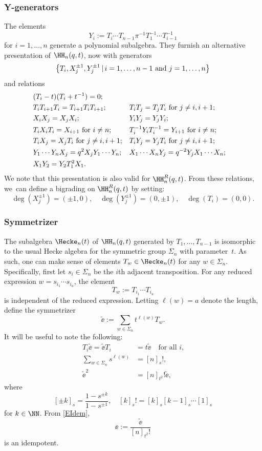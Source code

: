\subsubsection{Y-generators}\label{YGen}
The elements
\begin{equation}
Y_i:= T_i\cdots T_{n-1}\pi^{-1} T_1^{-1}\cdots T_{i-1}^{-1}
\label{YDef}
\end{equation}
for $i=1,\ldots,n$ generate a polynomial subalgebra.
They furnish an alternative presentation of $\HH_n(q,t)$, now with generators
\[
\left\{ T_i, X_j^{\pm 1}, Y_j^{\pm 1} \, | \, i=1,\ldots, n-1\hbox{ and }j=1,\ldots, n\right\}
\]
and relations
\begin{equation}
\begin{aligned}
&(T_i-t)(T_i+t^{-1})=0;\\
&T_iT_{i+1}T_i=T_{i+1}T_iT_{i+1};&& T_iT_j=T_jT_i\hbox{ for }j\not=i, i+1;\\
&X_iX_j=X_jX_i; && Y_iY_j=Y_jY_i;\\
&T_i X_i T_i=X_{i+1}\hbox{ for }i\not=n; && T_i^{-1}Y_iT_i^{-1}=Y_{i+1}\hbox{ for }i\not=n;\\
&T_iX_j=X_jT_i\hbox{ for }j\not=i, i+1;&&T_iY_j=Y_jT_i\hbox{ for }j\not=i, i+1;\\
&Y_1\cdots Y_nX_j=q^2X_jY_1\cdots Y_n;&& X_1\cdots X_nY_j=q^{-2}Y_jX_1\cdots X_n;\\
&X_1Y_2=Y_2T^2_1X_1.
\end{aligned}
\label{DAHAY}
\end{equation}
We note that this presentation is also valid for $\HH_n^R(q,t)$.
From these relations, we~can define a bigrading on $\HH_n^R(q,t)$ by setting:
\[
\deg(X_j^{\pm 1})= (\pm 1,0),\quad
\deg(Y_j^{\pm 1})= (0,\pm 1),\quad
\deg(T_i)= (0,0).
\]

\subsubsection{Symmetrizer}\label{Symmetrizer}
The subalgebra $\Hecke_n(t)$ of $\HH_n(q,t)$ generated by $T_1,\ldots, T_{n-1}$ is isomorphic to the usual Hecke algebra for the symmetric group $\Sigma_n$ with parameter~$t$.
As such, one can make sense of elements $T_w\in\Hecke_n(t)$ for any $w\in \Sigma_n$.
Specifically, first let $s_{i}\in\Sigma_n$ be the $i$th adjacent transposition.
For any reduced expression $w=s_{i_1}\cdots s_{i_a}$, the element
\[
T_w:=T_{i_1}\cdots T_{i_a}
\]
is independent of the reduced expression.
Letting $\ell(w)=a$ denote the length, define the symmetrizer
\[
\tilde{\ee}:=\sum_{w\in\Sigma_n}t^{\ell(w)}T_w.
\]
It will be useful to note the following:
\begin{align}
T_i\tilde{\ee}=\tilde{\ee} T_i&= t\tilde{\ee}\quad\text{for all $i$,}\label{EAbsorb}\\
\sum_{w\in \Sigma_n}s^{\ell(w)}&=[n]_s!,\nonumber\\[
-3pt]
\tilde{\ee}^2&=[n]_{t^2}!\tilde{\ee},\label{EIdem}
\end{align}
where
\[
[\pm k]_s=\frac{1-s^{\pm k}}{1-s^{\pm 1}},\quad [k]_s!=[k]_s[k-1]_s\cdots [1]_s
\]
for $k\in\NN$.
From \eqref{EIdem},
\[
\ee:=\frac{\tilde{\ee}}{[n]_{t^2}!}
\]
is an idempotent.

